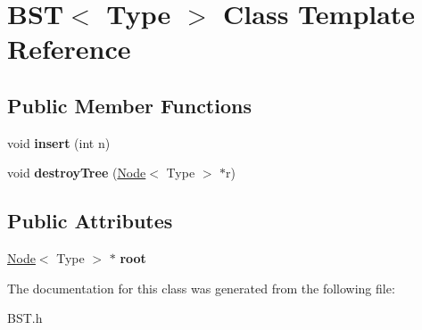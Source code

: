 \hypertarget{class_b_s_t}{}\section{B\+ST$<$ Type $>$ Class Template Reference}
\label{class_b_s_t}
\subsection*{Public Member Functions}
\begin{DoxyCompactItemize}
\item 
\mbox{\label{class_b_s_t_af7a270543cf9a8578d2c76d97b095fc8}} 
void {\bfseries insert} (int n)
\item 
\mbox{\label{class_b_s_t_a5a0f05ca244a5c4c2283374f14577e35}} 
void {\bfseries destroy\+Tree} (\mbox{\hyperlink{class_node}{Node}}$<$ Type $>$ $\ast$r)
\end{DoxyCompactItemize}
\subsection*{Public Attributes}
\begin{DoxyCompactItemize}
\item 
\mbox{\label{class_b_s_t_af75b94874fc64895e1185cd4b657d2d2}} 
\mbox{\hyperlink{class_node}{Node}}$<$ Type $>$ $\ast$ {\bfseries root}
\end{DoxyCompactItemize}


The documentation for this class was generated from the following file\+:\begin{DoxyCompactItemize}
\item 
B\+S\+T.\+h\end{DoxyCompactItemize}
